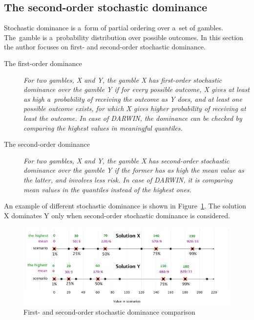\clearpage{}
\subsection{The second-order stochastic dominance}

Stochastic dominance is a~form of partial ordering over a~set of
gambles. The~gamble is a~probability distribution over possible outcomes. In
this section the author focuses on first- and second-order stochastic
dominance.

\begin{description}
\item[The first-order dominance] \textit{For two gambles, X and Y, the gamble
    X has first-order stochastic dominance over the gamble Y if for every
    possible outcome, X gives at least as high a~probability of receiving the
    outcome as Y does, and at least one possible outcome exists, for which X
    gives higher probability of receiving at least the outcome. In case of
    DARWIN, the dominance can be checked by comparing the highest values in
    meaningful quantiles.}

\item[The second-order dominance] \textit{For two gambles, X and Y, the gamble
    X has second-order stochastic dominance over the gamble Y if the former
    has as high the mean value as the latter, and involves less risk. In case
    of DARWIN, it is comparing mean values in the quantiles instead of the
    highest ones.}
\end{description}

An example of different stochastic dominance is shown in
Figure~\ref{stochdom}. The solution X dominates Y only when second-order
stochastic dominance is considered. 

\begin{figure}[h]
  \centering
    \includegraphics[scale=0.55]{img/stochdom}
  \caption{First- and second-order stochastic dominance comparison}
  \label{stochdom}
\end{figure}

